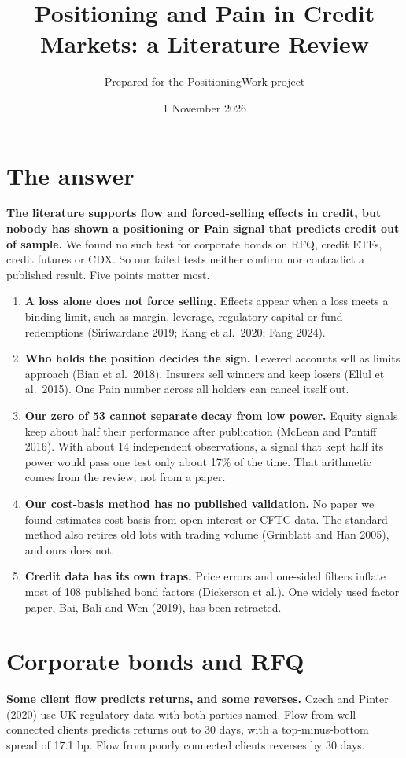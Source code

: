 \documentclass[11pt]{article}
\title{Positioning and Pain in Credit Markets: a Literature Review}
\author{Prepared for the PositioningWork project}
\date{1 November 2026}
\begin{document}
\maketitle

\section*{The answer}
\textbf{The literature supports flow and forced-selling effects in credit, but nobody has shown a positioning or Pain signal that predicts credit out of sample.} We found no such test for corporate bonds on RFQ, credit ETFs, credit futures or CDX. So our failed tests neither confirm nor contradict a published result. Five points matter most.

\begin{enumerate}
\item \textbf{A loss alone does not force selling.} Effects appear when a loss meets a binding limit, such as margin, leverage, regulatory capital or fund redemptions (Siriwardane 2019; Kang et al.\ 2020; Fang 2024).
\item \textbf{Who holds the position decides the sign.} Levered accounts sell as limits approach (Bian et al.\ 2018). Insurers sell winners and keep losers (Ellul et al.\ 2015). One Pain number across all holders can cancel itself out.
\item \textbf{Our zero of 53 cannot separate decay from low power.} Equity signals keep about half their performance after publication (McLean and Pontiff 2016). With about 14 independent observations, a signal that kept half its power would pass one test only about 17\% of the time. That arithmetic comes from the review, not from a paper.
\item \textbf{Our cost-basis method has no published validation.} No paper we found estimates cost basis from open interest or CFTC data. The standard method also retires old lots with trading volume (Grinblatt and Han 2005), and ours does not.
\item \textbf{Credit data has its own traps.} Price errors and one-sided filters inflate most of 108 published bond factors (Dickerson et al.). One widely used factor paper, Bai, Bali and Wen (2019), has been retracted.
\end{enumerate}

\section{Corporate bonds and RFQ}
\textbf{Some client flow predicts returns, and some reverses.} Czech and Pinter (2020) use UK regulatory data with both parties named. Flow from well-connected clients predicts returns out to 30 days, with a top-minus-bottom spread of 17.1 bp. Flow from poorly connected clients reverses by 30 days.
\end{document}
